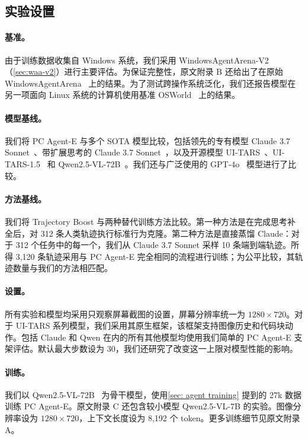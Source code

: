 \documentclass[10pt]{article}
\renewcommand{\cite}{\citep}
\begin{document}
\subsection{实验设置}
\label{sec: setup}

\paragraph{基准。}
由于训练数据收集自 Windows 系统，我们采用 WindowsAgentArena-V2（\autoref{sec:waa-v2}）进行主要评估。为保证完整性，原文附录 B 还给出了在原始 WindowsAgentArena~\cite{bonatti2024windowsagentarenaevaluating} 上的结果。为了测试跨操作系统泛化，我们还报告模型在另一项面向 Linux 系统的计算机使用基准 OSWorld~\cite{xie2024osworldbenchmarkingmultimodalagents} 上的结果。

\paragraph{模型基线。}
我们将 PC Agent-E 与多个 SOTA 模型比较，包括领先的专有模型 Claude 3.7 Sonnet~\cite{2025claude37}、带扩展思考的 Claude 3.7 Sonnet~\cite{2025claudethinking}，以及开源模型 UI-TARS~\cite{uitars2025}、UI-TARS-1.5~\cite{seedtars2025} 和 Qwen2.5-VL-72B~\cite{bai2025qwen25vltechnicalreport}。我们还与广泛使用的 GPT-4o~\cite{openai2024gpt4o} 模型进行了比较。

\paragraph{方法基线。}
我们将 Trajectory Boost 与两种替代训练方法比较。第一种方法是在完成思考补全后，对 312 条人类轨迹执行标准行为克隆。第二种方法是直接蒸馏 Claude：对于 312 个任务中的每一个，我们从 Claude 3.7 Sonnet 采样 10 条端到端轨迹。所得 3,120 条轨迹采用与 PC Agent-E 完全相同的流程进行训练；为公平比较，其轨迹数量与我们的方法相匹配。

\paragraph{设置。}
所有实验和模型均采用只观察屏幕截图的设置，屏幕分辨率统一为 $1280\times720$。对于 UI-TARS 系列模型，我们采用其原生框架，该框架支持图像历史和代码块动作。包括 Claude 和 Qwen 在内的所有其他模型均使用我们简单的 PC Agent-E 支架评估。默认最大步数设为 30，我们还研究了改变这一上限对模型性能的影响。

\paragraph{训练。}
我们以 Qwen2.5-VL-72B~\cite{bai2025qwen25vltechnicalreport} 为骨干模型，使用\autoref{sec: agent training} 提到的 27k 数据训练 PC Agent-E。原文附录 C 还包含较小模型 Qwen2.5-VL-7B 的实验。图像分辨率设为 $1280\times720$，上下文长度设为 8,192 个 token。更多训练细节见原文附录 A。
\end{document}

